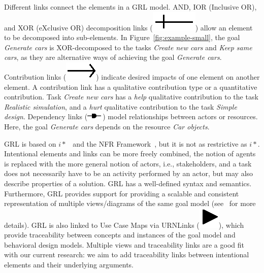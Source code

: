 Different links connect the elements in a GRL model. AND, IOR (Inclusive OR), and XOR (eXclusive OR) decomposition links (\includegraphics[scale=1]{img/decomposition}) allow an element to be decomposed into sub-elements. In Figure~\ref{fig:example-small}, the goal \emph{Generate cars} is XOR-decomposed to the tasks \emph{Create new cars} and \emph{Keep same cars}, as they are alternative ways of achieving the goal \emph{Generate cars}. Contribution links (\includegraphics[scale=1]{img/contribution}) indicate desired impacts of one element on another element. A contribution link has a qualitative contribution type or a quantitative contribution. Task \emph{Create new cars} has a \emph{help} qualitative contribution to the task \emph{Realistic simulation}, and a \emph{hurt} qualitative contribution to the task \emph{Simple design}. Dependency links (\includegraphics[scale=1]{img/dependency}) model relationships between actors or resources. Here, the goal \emph{Generate cars} depends on the resource \emph{Car objects}. 

GRL is based on $i*$~\cite{Yu:1997:TMR:827255.827807} and the NFR Framework~\cite{chung2012non}, but it is not as restrictive as $i*$. Intentional elements and links can be more freely combined, the notion of agents is replaced with the more general notion of actors, i.e., stakeholders, and a task does not necessarily have to be an activity performed by an actor, but may also describe properties of a solution. GRL has a well-defined syntax and semantics. Furthermore, GRL provides support for providing a scalable and consistent representation of multiple views/diagrams of the same goal model (see~\cite[Ch.2]{Ghanavati2013} for more details). GRL is also linked to Use Case Maps via URNLinks (\includegraphics[scale=1]{img/urnlink}), which provide traceability between concepts and instances of the goal model and behavioral design models. Multiple views and traceability links are a good fit with our current research: we aim to add traceability links between intentional elements and their underlying arguments. 

